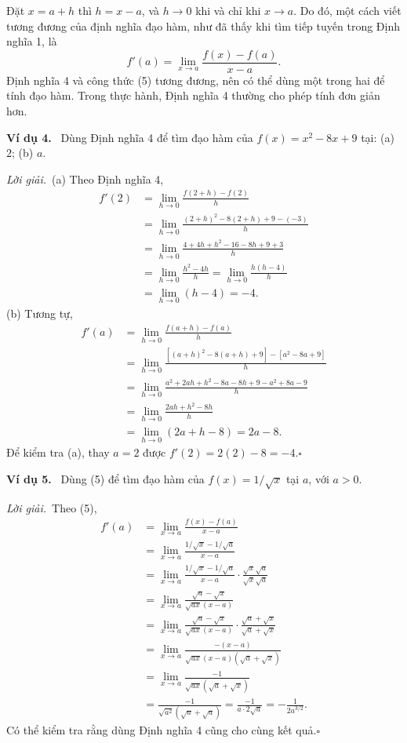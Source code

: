 \documentclass[12pt,a4paper]{article}
\newcommand{\ex}[1]{\par\medskip\noindent\textbf{Ví dụ #1.}\ }
\newcommand{\sol}{\par\nopagebreak[4]\noindent\textit{Lời giải.}\ }
\begin{document}
Đặt $x=a+h$ thì $h=x-a$, và $h\to0$ khi và chỉ khi $x\to a$. Do đó, một cách viết tương đương của định nghĩa đạo hàm, như đã thấy khi tìm tiếp tuyến trong Định nghĩa 1, là
\[f'(a)=\lim_{x\to a}\frac{f(x)-f(a)}{x-a}.\tag{5}\]
Định nghĩa 4 và công thức (5) tương đương, nên có thể dùng một trong hai để tính đạo hàm. Trong thực hành, Định nghĩa 4 thường cho phép tính đơn giản hơn.
\ex{4} Dùng Định nghĩa 4 để tìm đạo hàm của $f(x)=x^2-8x+9$ tại: (a) $2$; (b) $a$.
\sol (a) Theo Định nghĩa 4,
\begin{align*}
f'(2)&=\lim_{h\to0}\frac{f(2+h)-f(2)}h\\
&=\lim_{h\to0}\frac{(2+h)^2-8(2+h)+9-(-3)}h\\
&=\lim_{h\to0}\frac{4+4h+h^2-16-8h+9+3}h\\
&=\lim_{h\to0}\frac{h^2-4h}h=\lim_{h\to0}\frac{h(h-4)}h\\
&=\lim_{h\to0}(h-4)=-4.
\end{align*}
(b) Tương tự,
\begin{align*}
f'(a)&=\lim_{h\to0}\frac{f(a+h)-f(a)}h\\
&=\lim_{h\to0}\frac{[(a+h)^2-8(a+h)+9]-[a^2-8a+9]}h\\
&=\lim_{h\to0}\frac{a^2+2ah+h^2-8a-8h+9-a^2+8a-9}h\\
&=\lim_{h\to0}\frac{2ah+h^2-8h}h\\
&=\lim_{h\to0}(2a+h-8)=2a-8.
\end{align*}
Để kiểm tra (a), thay $a=2$ được $f'(2)=2(2)-8=-4$.\hfill$\square$
\ex{5} Dùng (5) để tìm đạo hàm của $f(x)=1/\sqrt{x}$ tại $a$, với $a>0$.
\sol Theo (5),
\begin{align*}
f'(a)&=\lim_{x\to a}\frac{f(x)-f(a)}{x-a}\\
&=\lim_{x\to a}\frac{1/\sqrt{x}-1/\sqrt{a}}{x-a}\\
&=\lim_{x\to a}\frac{1/\sqrt{x}-1/\sqrt{a}}{x-a}\cdot\frac{\sqrt{x}\sqrt{a}}{\sqrt{x}\sqrt{a}}\\
&=\lim_{x\to a}\frac{\sqrt{a}-\sqrt{x}}{\sqrt{ax}(x-a)}\\
&=\lim_{x\to a}\frac{\sqrt{a}-\sqrt{x}}{\sqrt{ax}(x-a)}\cdot\frac{\sqrt{a}+\sqrt{x}}{\sqrt{a}+\sqrt{x}}\\
&=\lim_{x\to a}\frac{-(x-a)}{\sqrt{ax}(x-a)(\sqrt{a}+\sqrt{x})}\\
&=\lim_{x\to a}\frac{-1}{\sqrt{ax}(\sqrt{a}+\sqrt{x})}\\
&=\frac{-1}{\sqrt{a^2}(\sqrt{a}+\sqrt{a})}=\frac{-1}{a\cdot2\sqrt{a}}=-\frac1{2a^{3/2}}.
\end{align*}
Có thể kiểm tra rằng dùng Định nghĩa 4 cũng cho cùng kết quả.\hfill$\square$
\end{document}
